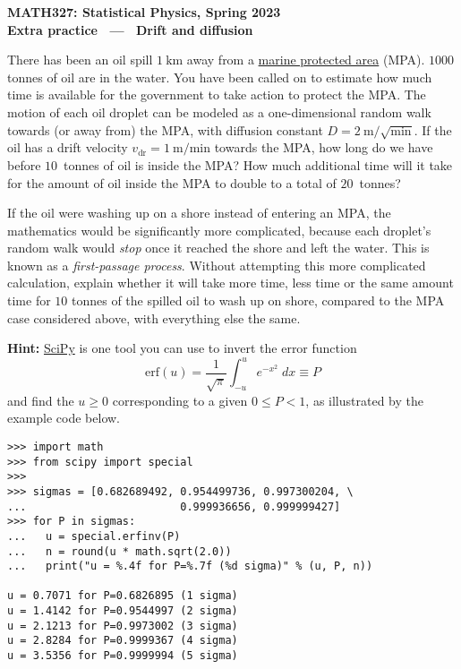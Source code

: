 \documentclass[12 pt]{article} %
\newcommand{\vdr}{\ensuremath{v_{\mathrm{dr}}} }
\begin{document}
\newcommand{\thisunit}{MATH327 Extra (Diffusion)}
\newcommand{\moddate}{Last modified 14 Apr.~2023}
\begin{center}
  {\Large \textbf{MATH327: Statistical Physics, Spring 2023}} \\[12 pt]
  {\Large \textbf{Extra practice \ --- \ Drift and diffusion}} \\[24 pt]
\end{center}

There has been an oil spill $1~\mathrm{km}$ away from a \href{https://en.wikipedia.org/wiki/Marine_protected_area}{marine protected area} (MPA).
$1000$ tonnes of oil are in the water.
You have been called on to estimate how much time is available for the government to take action to protect the MPA.
The motion of each oil droplet can be modeled as a one-dimensional random walk towards (or away from) the MPA, with diffusion constant $D = 2~\mathrm{m}/\sqrt{\mathrm{min}}$.
If the oil has a drift velocity $\vdr = 1~\mathrm{m}/\mathrm{min}$ towards the MPA, how long do we have before $10$~tonnes of oil is inside the MPA?
How much additional time will it take for the amount of oil inside the MPA to double to a total of $20$~tonnes?

If the oil were washing up on a shore instead of entering an MPA, the mathematics would be significantly more complicated, because each droplet's random walk would \textit{stop} once it reached the shore and left the water.
This is known as a \textit{first-passage process}.
Without attempting this more complicated calculation, explain whether it will take more time, less time or the same amount time for $10$ tonnes of the spilled oil to wash up on shore, compared to the MPA case considered above, with everything else the same.

\textbf{Hint:} \href{https://scipy.org}{SciPy} is one tool you can use to invert the error function
\begin{equation*}
  \mathrm{erf}(u) = \frac{1}{\sqrt{\pi}} \int_{-u}^u e^{-x^2} \; dx \equiv P
\end{equation*}
and find the $u \geq 0$ corresponding to a given $0 \leq P < 1$, as illustrated by the example code below.

\vfill
\begin{verbatim}
>>> import math
>>> from scipy import special
>>>
>>> sigmas = [0.682689492, 0.954499736, 0.997300204, \
...                        0.999936656, 0.999999427]
>>> for P in sigmas:
...   u = special.erfinv(P)
...   n = round(u * math.sqrt(2.0))
...   print("u = %.4f for P=%.7f (%d sigma)" % (u, P, n))

u = 0.7071 for P=0.6826895 (1 sigma)
u = 1.4142 for P=0.9544997 (2 sigma)
u = 2.1213 for P=0.9973002 (3 sigma)
u = 2.8284 for P=0.9999367 (4 sigma)
u = 3.5356 for P=0.9999994 (5 sigma)
\end{verbatim}
\end{document}
